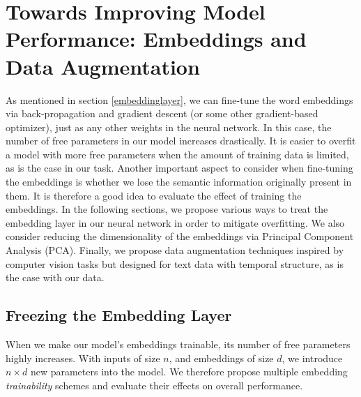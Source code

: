 
\chapter{Towards Improving Model Performance: Embeddings and Data Augmentation}
As mentioned in section \ref{embeddinglayer}, we can fine-tune the word embeddings via back-propagation and gradient descent (or some other
gradient-based optimizer), just as any other weights in the neural network. In this case, the number of free parameters in our model increases drastically.
It is easier to overfit a model with more free parameters when the amount of training data is limited, as is the case in our task. Another important aspect to consider when fine-tuning the embeddings is whether we lose the semantic information originally
present in them. It is therefore a good idea to evaluate the effect of training the embeddings. In the following sections, we propose various ways
to treat the embedding layer in our neural network in order to mitigate overfitting. We also consider reducing the dimensionality of the embeddings
via Principal Component Analysis (PCA). Finally, we propose data augmentation techniques inspired by computer vision tasks but designed for
text data with temporal structure, as is the case with our data.

\section{Freezing the Embedding Layer}
When we make our model's embeddings trainable, its number of free parameters highly increases. With inputs of size $n$,
and embeddings of size $d$, we introduce $n \times d$ new parameters into the model.
We therefore propose multiple embedding \textit{trainability} schemes and evaluate their effects on overall performance.

